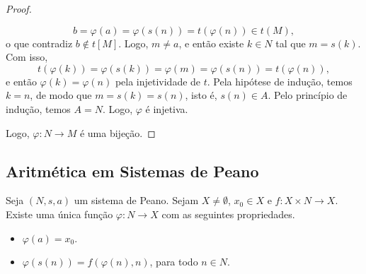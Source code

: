 \begin{proof}
\begin{midproof}
\[                    b = \varphi(a) = \varphi(s(n)) = t(\varphi(n)) \in t(M),
                \]
            o que contradiz $b \notin t[M]$. Logo, $m \neq a$, e então existe $k \in N$ tal que $m = s(k)$. Com isso,
                \[
                    t(\varphi(k)) = \varphi(s(k)) = \varphi(m) = \varphi(s(n)) = t(\varphi(n)),
                \]
            e então $\varphi(k) = \varphi(n)$ pela injetividade de $t$. Pela hipótese de indução, temos $k=n$, de modo que $m = s(k) = s(n)$, isto é, $s(n) \in A$. Pelo princípio de indução, temos $A = N$. Logo, $\varphi$ é injetiva. \whiteproof
        \end{midproof}
    Logo, $\varphi : N \to M$ é uma bijeção. \blackproof
\end{proof}

\subsection{Aritmética em Sistemas de Peano}

\begin{theorem} \label{teo.set:recpar1} 
    Seja $(N,s,a)$ um sistema de Peano. Sejam $X \neq \emptyset$, $x_0 \in X$ e $f : X \times N \to X$. Existe uma única função $\varphi : N \to X$ com as seguintes propriedades.
        \begin{itemize}
            \item $\varphi(a) = x_0$.
            \item $\varphi(s(n)) = f(\varphi(n), n)$, para todo $n \in N$.
        \end{itemize}
\end{theorem}

